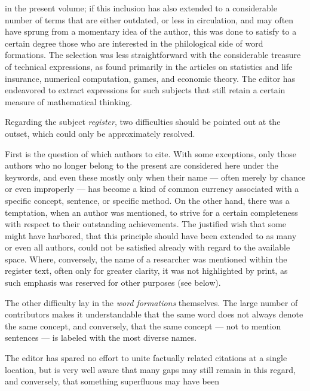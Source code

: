 \thispagestyle{fancy}

\vspace{0.5cm}

in the present volume; if this inclusion has also extended to a considerable number of terms that are either outdated, or less in circulation, and may often have sprung from a momentary idea of the author, this was done to satisfy to a certain degree those who are interested in the philological side of word formations. The selection was less straightforward with the considerable treasure of technical expressions, as found primarily in the articles on statistics and life insurance, numerical computation, games, and economic theory. The editor has endeavored to extract expressions for such subjects that still retain a certain measure of mathematical thinking.

Regarding the subject \textit{register}, two difficulties should be pointed out at the outset, which could only be approximately resolved.

First is the question of which authors to cite. With some exceptions, only those authors who no longer belong to the present are considered here under the keywords, and even these mostly only when their name — often merely by chance or even improperly — has become a kind of common currency associated with a specific concept, sentence, or specific method. On the other hand, there was a temptation, when an author was mentioned, to strive for a certain completeness with respect to their outstanding achievements. The justified wish that some might have harbored, that this principle should have been extended to as many or even all authors, could not be satisfied already with regard to the available space. Where, conversely, the name of a researcher was mentioned within the register text, often only for greater clarity, it was not highlighted by print, as such emphasis was reserved for other purposes (see below).

The other difficulty lay in the \textit{word formations} themselves. The large number of contributors makes it understandable that the same word does not always denote the same concept, and conversely, that the same concept — not to mention sentences — is labeled with the most diverse names.

The editor has spared no effort to unite factually related citations at a single location, but is very well aware that many gaps may still remain in this regard, and conversely, that something superfluous may have been

